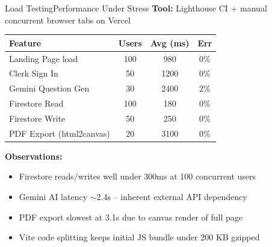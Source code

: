 \documentclass{beamer}
\begin{document}
\begin{frame}{Load Testing}{Performance Under Stress}
\scriptsize
\textbf{Tool:} Lighthouse CI + manual concurrent browser tabs on Vercel
\begin{table}
\centering
\scriptsize
\begin{tabular}{|p{2.8cm}|c|c|c|}
\hline
\textbf{Feature} & \textbf{Users} & \textbf{Avg (ms)} & \textbf{Err} \\ \hline
Landing Page load & 100 & 980 & 0\% \\ \hline
Clerk Sign In & 50 & 1200 & 0\% \\ \hline
Gemini Question Gen & 30 & 2400 & 2\% \\ \hline
Firestore Read & 100 & 180 & 0\% \\ \hline
Firestore Write & 50 & 250 & 0\% \\ \hline
PDF Export (html2canvas) & 20 & 3100 & 0\% \\ \hline
\end{tabular}
\end{table}
\textbf{Observations:}
\begin{itemize}\setlength{\itemsep}{1pt}
    \item Firestore reads/writes well under 300ms at 100 concurrent users
    \item Gemini AI latency $\sim$2.4s -- inherent external API dependency
    \item PDF export slowest at 3.1s due to canvas render of full page
    \item Vite code splitting keeps initial JS bundle under 200 KB gzipped
\end{itemize}
\end{frame}

\end{document}

